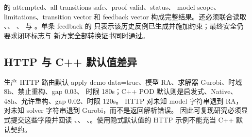  的 attempted、all transitions safe、proof valid、status、
model scope、limitations、transition vector 和 feedback vector 构成完整结果。还必须联合读取
、、
、 与
。单条 feedback 的
 只表示该历史反例已生成并施加约束；最终安全仍要求闭环标志与
新方案全部转换证书同时通过。

\subsection{HTTP 与 C++ 默认值差异}

生产 HTTP 路由默认 apply demo data=true、模型 RA、求解器 Gurobi、时域 8h、禁止重构、gap 0.03、
时限 180s；C++ POD 默认则是启发式、Native、48h、允许重构、gap 0.02、时限 120s。
HTTP 对未知 model 字符串退到 RA，对未知 solver 字符串退到 Gurobi，而不是返回解析错误。
因此可复现研究必须显式提交这些字段并回读 、、
、。使用隐式默认值的 HTTP 示例不能充当 C++ 默认契约。
